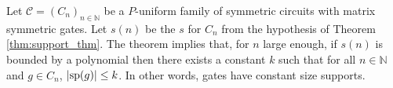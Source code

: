 \documentclass[../paper.tex]{subfiles}
\begin{document}
Let $\mathcal{C} = (C_n)_{n \in \mathbb{N}}$ be a $P$-uniform family of
symmetric circuits with matrix symmetric gates. Let $s(n)$ be the $s$ for $C_n$
from the hypothesis of Theorem \ref{thm:support_thm}. The theorem implies that,
for $n$ large enough, if $s(n)$ is bounded by a polynomial then there exists a
constant $k$ such that for all $n \in \mathbb{N}$ and $g \in C_n$, $\vert
\text{sp}(g) \vert \leq k$. In other words, gates have constant size supports.
\end{document}
